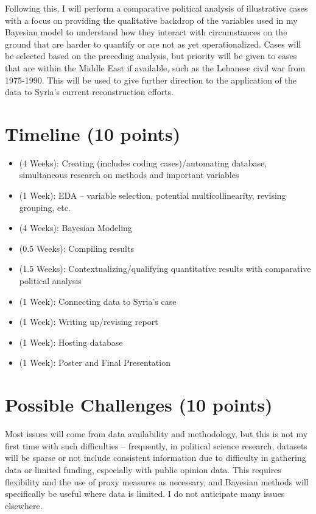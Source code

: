 \documentclass[11pt]{article}
\begin{document}
Following this, I will perform a comparative political analysis of illustrative cases with a focus on providing the qualitative backdrop of the variables used in my Bayesian model to understand how they interact with circumstances on the ground that are harder to quantify or are not as yet operationalized. Cases will be selected based on the preceding analysis, but priority will be given to cases that are within the Middle East if available, such as the Lebanese civil war from 1975-1990. This will be used to give further direction to the application of the data to Syria’s current reconstruction efforts.

\section{Timeline (10 points)}
\begin{itemize}
    \item (4 Weeks): Creating (includes coding cases)/automating database, simultaneous research on methods and important variables
    \item (1 Week): EDA – variable selection, potential multicollinearity, revising grouping, etc.
    \item (4 Weeks): Bayesian Modeling 
    \item (0.5 Weeks): Compiling results
    \item (1.5 Weeks): Contextualizing/qualifying quantitative results with comparative political analysis
    \item (1 Week): Connecting data to Syria’s case
    \item (1 Week): Writing up/revising report
    \item (1 Week): Hosting database
    \item (1 Week): Poster and Final Presentation
\end{itemize}
\section{Possible Challenges (10 points)}

Most issues will come from data availability and methodology, but this is not my first time with such difficulties – frequently, in political science research, datasets will be sparse or not include consistent information due to difficulty in gathering data or limited funding, especially with public opinion data. This requires flexibility and the use of proxy measures as necessary, and Bayesian methods will specifically be useful where data is limited. I do not anticipate many issues elsewhere.




\end{document}
